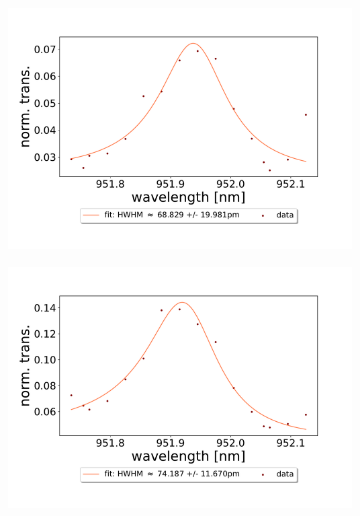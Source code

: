 \begin{figure}[h!]
    \centering
    \begin{subfigure}[b]{0.49\textwidth}
        \includegraphics[width=\textwidth]{figures/results/double fano fits/20250326/21um_M3:M5_fit_1.pdf}
        \caption{}
        \label{fig:21um_M3:M5_fit_1}
    \end{subfigure}
    \begin{subfigure}[b]{0.49\textwidth}
        \includegraphics[width=\textwidth]{figures/results/double fano fits/20250326/21um_M3:M5_fit_2.pdf}
        \caption{}
        \label{fig:21um_M3:M5_fit_2}
    \end{subfigure}
    \begin{subfigure}[b]{0.49\textwidth}

\end{subfigure}
\end{figure}
